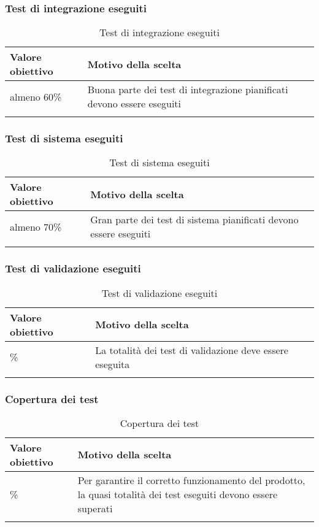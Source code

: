\documentclass[../PianoDiQualifica_v3.0.0.tex]{subfiles}
\begin{document}
		\subsubsection{Test di integrazione eseguiti}
			\begin{longtable}[c] { >{\centering\arraybackslash}p{4cm} p{7cm} }
				\toprule
				\centerline{\textbf{Valore obiettivo}} & \centerline{\textbf{Motivo della scelta}} \\
				\midrule
					almeno 60\% & Buona parte dei test di integrazione pianificati devono essere eseguiti \\
				\bottomrule
				\caption{Test di integrazione eseguiti}
			\end{longtable}

		\subsubsection{Test di sistema eseguiti}
			\begin{longtable}[c] { >{\centering\arraybackslash}p{4cm} p{7cm} }
				\toprule
				\centerline{\textbf{Valore obiettivo}} & \centerline{\textbf{Motivo della scelta}} \\
				\midrule
					almeno 70\% & Gran parte dei test di sistema pianificati devono essere eseguiti\\
				\bottomrule
				\caption{Test di sistema eseguiti}
			\end{longtable}

		\subsubsection{Test di validazione eseguiti}
			\begin{longtable}[c] { >{\centering\arraybackslash}p{4cm} p{7cm} }
				\toprule
				\centerline{\textbf{Valore obiettivo}} & \centerline{\textbf{Motivo della scelta}} \\
				\midrule
					100\% &	La totalità dei test di validazione deve essere eseguita \\
				\bottomrule
				\caption{Test di validazione eseguiti}
			\end{longtable}

		\subsubsection{Copertura dei test}
			\begin{longtable}[c] { >{\centering\arraybackslash}p{4cm} p{7cm} }
				\toprule
				\centerline{\textbf{Valore obiettivo}} & \centerline{\textbf{Motivo della scelta}} \\
				\midrule
					90\% & Per garantire il corretto funzionamento del prodotto, la quasi totalità dei test eseguiti devono essere superati \\
				\bottomrule
				\caption{Copertura dei test}
			\end{longtable}
\end{document}
